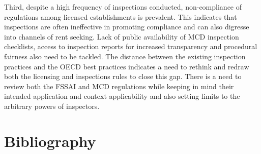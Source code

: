 \documentclass[a4paper, 12pt, twoside]{article}
\begin{document}
Third, despite a high frequency of inspections conducted, non-compliance of regulations among licensed establishments is prevalent. This indicates that inspections are often ineffective in promoting compliance and can also digresse into channels of rent seeking. Lack of public availability of MCD inspection checklists, access to inspection reports for increased transparency and procedural fairness also need to be tackled. The distance between the existing inspection practices and the OECD best practices indicates a need to rethink and redraw both the licensing and inspections rules to close this gap. There is a need to review both the FSSAI and MCD regulations while keeping in mind their intended application and context applicability and also setting limits to the arbitrary powers of inspectors. \\

\section*{Bibliography}
\printbibliography[heading=none] 

\newpage 
\end{document}
